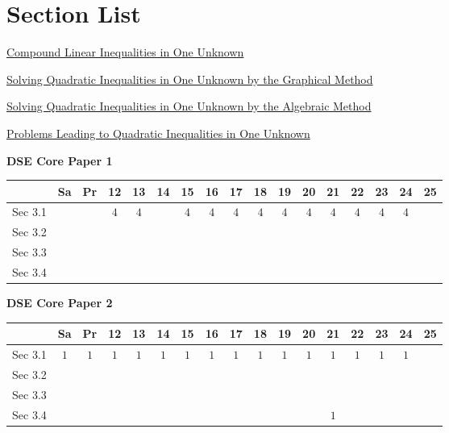 \documentclass[12pt, a4paper]{article}
\begin{document}
\section*{Section List}
\begin{enumx}[label=Sec 3.\arabic*\ ]
\item \hyperref[section:5-3-1]{Compound Linear Inequalities in One Unknown}
\item \hyperref[section:5-3-2]{Solving Quadratic Inequalities in One Unknown by the Graphical Method}
\item \hyperref[section:5-3-3]{Solving Quadratic Inequalities in One Unknown by the Algebraic Method \NF}
\item \hyperref[section:5-3-4]{Problems Leading to Quadratic Inequalities in One Unknown}
\end{enumx}
\begin{absolutelynopagebreak}
\begin{center}
\textbf{DSE Core Paper 1}
\end{center}
\begin{center}
\begin{tabular}{|l|c|c|c|c|c|c|c|c|c|c|c|c|c|c|c|c|}
\hline
        & Sa & Pr & 12 & 13 & 14 & 15 & 16 & 17 & 18 & 19 & 20 & 21 & 22 & 23 & 24 & 25 \\\hline\hline
Sec 3.1 &  &  &  $4$ &  $4$ &  &  $4$ &  $4$ &  $4$ &  $4$ &  $4$ &  $4$ &  $4$ &  $4$ &  $4$ &  $4$ &  \\\hline
Sec 3.2 &  &  &  &  &  &  &  &  &  &  &  &  &  &  &  &  \\\hline
Sec 3.3 &  &  &  &  &  &  &  &  &  &  &  &  &  &  &  &  \\\hline
Sec 3.4 &  &  &  &  &  &  &  &  &  &  &  &  &  &  &  &  \\\hline
\end{tabular}
\end{center}
\end{absolutelynopagebreak}
\begin{absolutelynopagebreak}
\begin{center}
\textbf{DSE Core Paper 2}
\end{center}
\begin{center}
\begin{tabular}{|l|c|c|c|c|c|c|c|c|c|c|c|c|c|c|c|c|}
\hline
        & Sa & Pr & 12 & 13 & 14 & 15 & 16 & 17 & 18 & 19 & 20 & 21 & 22 & 23 & 24 & 25 \\\hline\hline
Sec 3.1 &  $1$ &  $1$ &  $1$ &  $1$ &  $1$ &  $1$ &  $1$ &  $1$ &  $1$ &  $1$ &  $1$ &  $1$ &  $1$ &  $1$ &  $1$ &  \\\hline
Sec 3.2 &  &  &  &  &  &  &  &  &  &  &  &  &  &  &  &  \\\hline
Sec 3.3 &  &  &  &  &  &  &  &  &  &  &  &  &  &  &  &  \\\hline
Sec 3.4 &  &  &  &  &  &  &  &  &  &  &  &  $1$ &  &  &  &  \\\hline
\end{tabular}
\end{center}
\end{absolutelynopagebreak}
\end{document}
